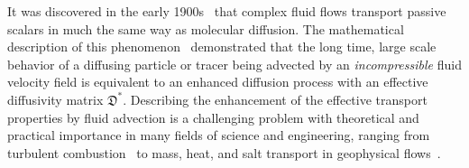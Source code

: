 \documentclass[english,12pt,jmp,graphicx]{revtex4-1}
\newcommand{\Dg}{\mathfrak{D}}
\begin{document}
 
  


It was discovered in the early 1900s~\cite{Taylor:1915:523} 
that complex fluid flows transport passive scalars in much the same
way as molecular diffusion. The mathematical description of
this phenomenon~\cite{Taylor:PRSL:196} demonstrated that the long
time, large scale behavior of a diffusing particle or tracer being
advected by an \emph{incompressible} fluid velocity field is equivalent to an
enhanced diffusion process with an effective diffusivity matrix
$\Dg^*$. Describing the enhancement of the effective transport
properties by
fluid advection is a challenging
problem with theoretical and practical importance in many fields of
science and engineering, ranging from turbulent
combustion~\cite{Aslanyan:BF00790149,Bilger:05:10.1016,Tabaczynski:1990:243,%
Williams:1985:TC:9781611971064,Peters:2000:TC:9780521660822,Xin:2009:Fronts:9780387876832}
to mass, heat, and salt transport in geophysical flows~\cite{Moffatt:RPP:621}. 
\end{document}
